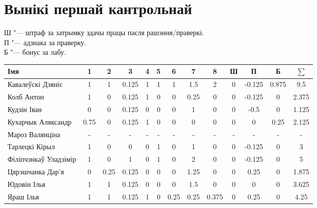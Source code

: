 

\geometry{left=1.5cm}


	\section{Вынікі першай кантрольнай}
	\noindent Ш "--- штраф за затрымку здачы працы пасля рашэння/праверкі. \\
	П "--- адзнака за праверку. \\
	Б "--- бонус за лабу.
\begin{table}[H]
	\begin{tabular}{|l|c|c|c|c|c|c|c|c|c|c|c|c|}
		\hline
		Імя                   &  1   &  2   &   3   & 4 & 5 &  6   &  7   &   8   & Ш &   П    &   Б   & $\sum$ \\ \hline
		Кавалеўскі Дзяніс     &  1   &  1   & 0.125 & 1 & 1 &  1   &  1.5 &   2   & 0 & -0.125 & 0.875 &   9.5  \\ \hline
		Колб Антон            &  1   &  0   & 0.125 & 1 & 0 &  0   & 0.25 &   0   & 0 & -0.125 &   0   &  2.375 \\ \hline
		Кудзін Іван           &  0   &  0   & 0.125 & 0 & 0 &  0   &  1   &   0   & 0 &  -0.5  &   0   &  1.125 \\ \hline
		Кухарчык Аляксандр    & 0.75 &  0   & 0.125 & 1 & 0 &  0   &  0   &   0   & 0 &   0    &  0.25 &  2.125 \\ \hline
		Мароз Валянціна       &  -   &  -   &   -   & - & - &  -   &  -   &   -   & - &   -    &   -   &   -    \\ \hline
		Тарлецкі Кірыл        &  1   &  0   &   0   & 0 & 1 &  0   &  1   &   0   & 0 & -0.125 &   0   &   3    \\ \hline
		Філіпчэнкаў Уладзімір &  1   &  0   &   1   & 0 & 1 &  0   &  2   &   0   & 0 & -0.125 &   0   &   5    \\ \hline
		Цярэшчанка Дар'я      &  0   & 0.25 & 0.125 & 0 & 0 &  0   & 1.25 &   0   & 0 &  0.25  &   0   &  1.875 \\ \hline
		Юдовін Ілья           &  1   &  1   & 0.125 & 0 & 0 &  0   &  1.5 &   0   & 0 &   0    &   0   &  3.625 \\ \hline
		Яраш Ілья             &  1   &  1   & 0.125 & 1 & 0 & 0.25 & 0.25 & 0.375 & 0 &  0.25  &   0   &  4.25  \\ \hline
	\end{tabular}
\end{table}


